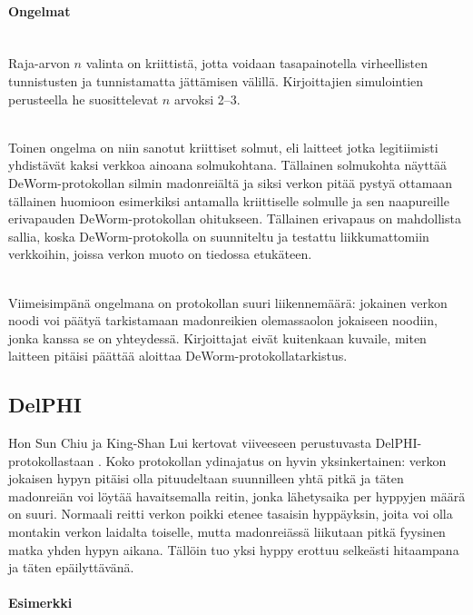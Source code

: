 \documentclass[finnish]{tktltiki2}
\theoremstyle{definition}
\theoremstyle{remark}
\begin{document}
\paragraph{Ongelmat}
\noindent \\
Raja-arvon $n$ valinta on kriittistä, jotta voidaan tasapainotella virheellisten tunnistusten ja tunnistamatta jättämisen välillä. Kirjoittajien simulointien perusteella he suosittelevat $n$ arvoksi 2--3.

\noindent \\
Toinen ongelma on niin sanotut kriittiset solmut, eli laitteet jotka legitiimisti yhdistävät kaksi verkkoa ainoana solmukohtana. Tällainen solmukohta näyttää DeWorm-protokollan silmin madonreiältä ja siksi verkon pitää pystyä ottamaan tällainen huomioon esimerkiksi antamalla kriittiselle solmulle ja sen naapureille erivapauden DeWorm-protokollan ohitukseen. Tällainen erivapaus on mahdollista sallia, koska DeWorm-protokolla on suunniteltu ja testattu liikkumattomiin verkkoihin, joissa verkon muoto on tiedossa etukäteen.

\noindent \\
Viimeisimpänä ongelmana on protokollan suuri liikennemäärä: jokainen verkon noodi voi päätyä tarkistamaan madonreikien olemassaolon jokaiseen noodiin, jonka kanssa se on yhteydessä. Kirjoittajat eivät kuitenkaan kuvaile, miten laitteen pitäisi päättää aloittaa DeWorm-protokollatarkistus.

% 
% 
% 
% 
% 
% 
% 
% 
% 
% 
\subsection{DelPHI}
% 
% 
% 
% 
% 
% 
% 
% 
% 
% 
% 
% 

Hon Sun Chiu ja King-Shan Lui kertovat viiveeseen perustuvasta DelPHI-protokollastaan \cite{delphi}. Koko protokollan ydinajatus on hyvin yksinkertainen: verkon jokaisen hypyn pitäisi olla pituudeltaan suunnilleen yhtä pitkä ja täten madonreiän voi löytää havaitsemalla reitin, jonka lähetysaika per hyppyjen määrä on suuri. Normaali reitti verkon poikki etenee tasaisin hyppäyksin, joita voi olla montakin verkon laidalta toiselle, mutta madonreiässä liikutaan pitkä fyysinen matka yhden hypyn aikana. Tällöin tuo yksi hyppy erottuu selkeästi hitaampana ja täten epäilyttävänä.

\paragraph{Esimerkki}
\end{document}
